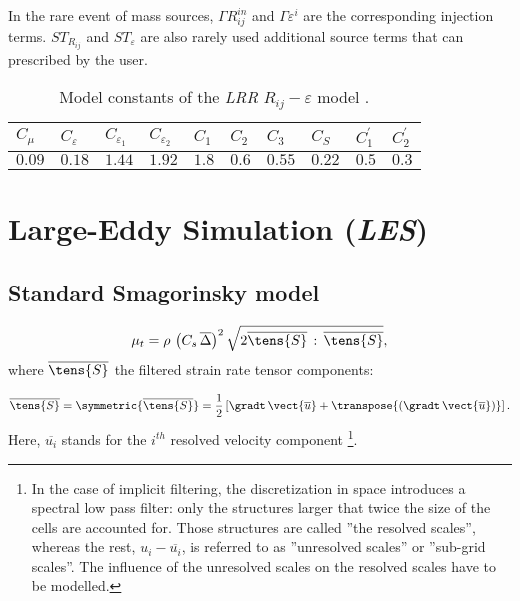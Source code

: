 In the rare event of mass sources, $\Gamma R_{ij}^{in}$ and $\Gamma
\varepsilon ^{i}$ are the corresponding injection terms. $ST_{R_{ij}}$ and $%
ST_{\varepsilon }$ are also rarely used additional source terms that can
prescribed by the user.

\begin{table}[!htp]
\begin{center}
\begin{tabular}{p{}|p{}|p{}|p{}|p{}|p{}|p{}|p{}|p{}|p{}}
$C_\mu$ & $C_{\varepsilon}$ & $C_{\varepsilon_1}$ & $C_{\varepsilon_2}$ & $%
C_1$ & $C_2$ & $C_3$ & $C_S$ & $C^{\prime}_1$ & $C^{\prime}_2$ \\ \hline
$0.09$ & $0.18$ & $1.44$ & $1.92$ & $1.8$ & $0.6$ & $0.55$ & $0.22$ & $0.5$
& $0.3$ 
\end{tabular}
\end{center}
\caption{Model constants of the \emph{LRR} $R_{ij}-\varepsilon$ model \cite{Launder:1975}.}
\end{table}

\section{Large-Eddy Simulation (\emph{LES})}

\subsection{Standard Smagorinsky model}

\begin{equation}
\mu_{t}=\rho \, \left( C_{s}\,\overline{\Delta } \right)^{2}
\sqrt{2\overline{\tens{S}} \,: \, \overline{\tens{S}}},
\end{equation}%
%
where $\overline{\tens{S}}$ the filtered strain rate tensor components:

\begin{equation}
\overline{\tens{S}}= \symmetric{\overline{\tens{S}}} =
\frac{1}{2} \left[ \gradt \, \vect{\overline{u}} + \transpose{\left( \gradt \, \vect{\overline{u}} \right)}
\right].
\end{equation}
%
%
Here, $\overline{u_{i}}$ stands for the $i^{th}$ resolved velocity component
\footnote{%
In the case of implicit filtering, the discretization in space introduces a
spectral low pass filter: only the structures larger that twice the size of
the cells are accounted for. Those structures are called ''the resolved
scales'', whereas the rest, $u_{i}-\overline{u_{i}}$, is referred to as
''unresolved scales'' or ''sub-grid scales''. The influence of the
unresolved scales on the resolved scales have to be modelled.}. 

